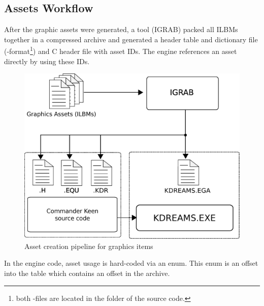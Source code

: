 \documentclass[book.tex]{subfiles}
\begin{document}
\subsection{Assets Workflow}
After the graphic assets were generated, a tool (IGRAB) packed all ILBMs together in a compressed archive and generated a header table and dictionary file (-format\footnote{both -files are located in the  folder of the source code.}) and C header file with asset IDs. The engine references an asset directly by using these IDs.\\
\begin{figure}[H]
\centering
 \includegraphics[width=.9\textwidth]{imgs/drawings/drawing_plain.eps}
 \caption{Asset creation pipeline for graphics items}
 \label{asset-creation-pipeline}
\end{figure}
\par
\begin{minipage}{\textwidth}
 \par
 \end{minipage}
 
 In the engine code, asset usage is hard-coded via an enum. This enum is an offset into the  table which contains an offset in the  archive. 

\pagebreak
\end{document}
